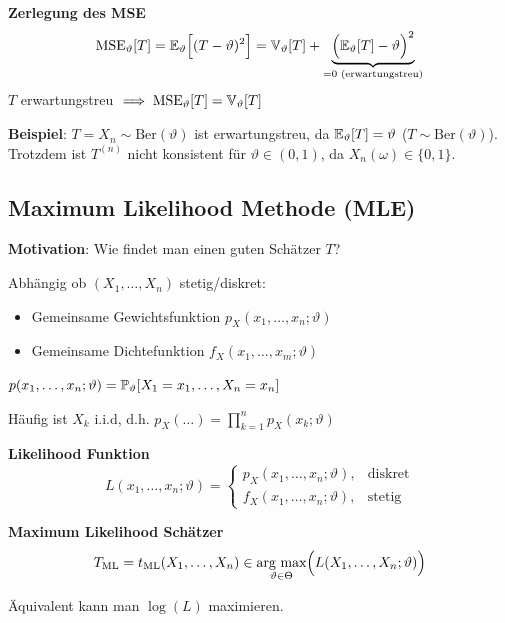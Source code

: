 \lemma \textbf{Zerlegung des MSE}
$$
    \text{MSE}_\vartheta[T] = \E_\vartheta\Bigl[ (T-\vartheta)^2 \Bigr] = \V_\vartheta[T] + \underbrace{\Bigl( \E_\vartheta[T]-\vartheta \Bigr)^2}_{=0 \text{ (erwartungstreu)}}
$$
{\footnotesize
    \remark $T$ erwartungstreu $\implies \text{MSE}_\vartheta[T]=\V_\vartheta[T]$ 
}

{\scriptsize
    \textbf{Beispiel}: $T = X_n \sim \text{Ber}(\vartheta)$ ist erwartungstreu, da $\E_\vartheta[T]=\vartheta$ ($T \sim \text{Ber}(\vartheta)$).
    Trotzdem ist $T^{(n)}$ nicht konsistent für $\vartheta \in (0,1)$, da $X_n(\omega)\in\{0,1\}$.
}

\subsection{Maximum Likelihood Methode (MLE)}

\textbf{Motivation}: Wie findet man einen guten Schätzer $T$?

Abhängig ob $(X_1,\ldots,X_n)$ stetig/diskret:
\begin{itemize}
    \item Gemeinsame Gewichtsfunktion $p_X(x_1,\ldots,x_n;\vartheta)$
    \item Gemeinsame Dichtefunktion $f_X(x_1,\ldots,x_m;\vartheta)$
\end{itemize}

{\footnotesize
    \remark $p(x_1,\ldots,x_n;\vartheta) = \P_\vartheta[X_1=x_1,\ldots,X_n=x_n]$

    \remark Häufig ist $X_k$ i.i.d, d.h. $p_X(\ldots)=\prod_{k=1}^np_X(x_k;\vartheta)$
}

 \textbf{Likelihood Funktion}
$$
    L(x_1,\ldots,x_n;\vartheta) = \begin{cases}
        p_X(x_1,\ldots,x_n;\vartheta), & \text{diskret} \\
        f_X(x_1,\ldots,x_n;\vartheta), & \text{stetig}
    \end{cases}
$$

 \textbf{Maximum Likelihood Schätzer}\\
$$
    T_\text{ML} = t_\text{ML}(X_1,\ldots,X_n) \in \underset{\vartheta\in\Theta}{\text{arg max}}\Bigl( L(X_1,\ldots,X_n;\vartheta) \Bigr)
$$

\remark Äquivalent kann man $\log(L)$ maximieren.\\

